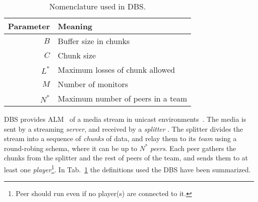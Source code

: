
\label{sec:DBS}

\begin{table}
  \begin{tabular}{rl}
    Parameter & Meaning \\
    \hline
    $B$    & Buffer size in chunks \\
    $C$    & Chunk size \\
    $L^*$  & Maximum losses of chunk allowed \\
    $M$    & Number of monitors \\
    $N^*$  & Maximum number of peers in a team
  \end{tabular}
  \caption{Nomenclature used in DBS.\label{tab:DBS_nomenclature}}
\end{table}

DBS provides ALM~\cite{banerjee2002scalable} of a media stream in
unicast environments~\cite{comer2003computer}. The media is sent by a
streaming \emph{server}, and received by a \emph{splitter} . The splitter divides the stream into a
sequence of \emph{chunks} of data, and relay them to its \emph{team}
using a round-robing schema, where it can be up to $N^*$
\emph{peers}. Each peer gathers the chunks from the splitter and the
rest of peers of the team, and sends them to at least one
\emph{player}\footnote{Peer should run even if no player(s) are
  connected to it.}. In Tab.~\ref{tab:DBS_nomenclature} the
definitions used the DBS have been summarized.

\begin{comment}
In single layered streams\footnote{Each layer of a
  scalable stream is received by a different peer attached to the same
  player capable or render scalable media.}, each peer is spawned by a
player (normal users should not run peers directly).
\end{comment}

\begin{comment}
/* quitar: We define the set of teams as
$\{T\}$,
and enumerate the peers in the team $T$ as $T=\{P_1,\cdots,P_{|T|}\}$. */
\end{comment}
